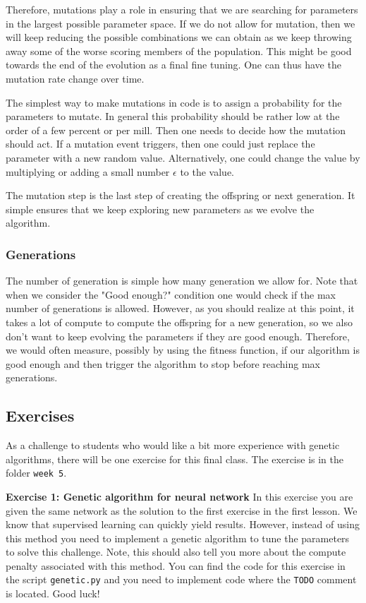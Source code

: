 \documentclass[12pt,a4paper]{article} %
\numberwithin{equation}{section}
\begin{document}
			Therefore, mutations play a role in ensuring that we are searching for parameters in the largest possible parameter space. If we do not allow for mutation, then we will keep reducing the possible combinations we can obtain as we keep throwing away some of the worse scoring members of the population. This might be good towards the end of the evolution as a final fine tuning. One can thus have the mutation rate change over time.
		
			The simplest way to make mutations in code is to assign a probability for the parameters to mutate. In general this probability should be rather low at the order of a few percent or per mill. Then one needs to decide how the mutation should act. If a mutation event triggers, then one could just replace the parameter with a new random value. Alternatively, one could change the value by multiplying or adding a small number $\epsilon$ to the value.
			
			The mutation step is the last step of creating the offspring or next generation. It simple ensures that we keep exploring new parameters as we evolve the algorithm.
		
		\subsubsection{Generations}
			The number of generation is simple how many generation we allow for. Note that when we consider the "Good enough?" condition one would check if the max number of generations is allowed. However, as you should realize at this point, it takes a lot of compute to compute the offspring for a new generation, so we also don't want to keep evolving the parameters if they are good enough. Therefore, we would often measure, possibly by using the fitness function, if our algorithm is good enough and then trigger the algorithm to stop before reaching max generations. 
	
	\subsection{Exercises}
		As a challenge to students who would like a bit more experience with genetic algorithms, there will be one exercise for this final class. The exercise is in the folder \texttt{week 5}.\newline
		
		\textbf{Exercise 1: Genetic algorithm for neural network}\newline
		In this exercise you are given the same network as the solution to the first exercise in the first lesson. We know that supervised learning can quickly yield results. However, instead of using this method you need to implement a genetic algorithm to tune the parameters to solve this challenge. Note, this should also tell you more about the compute penalty associated with this method. You can find the code for this exercise in the script \texttt{genetic.py} and you need to implement code where the \texttt{TODO} comment is located. Good luck!
\end{document}

